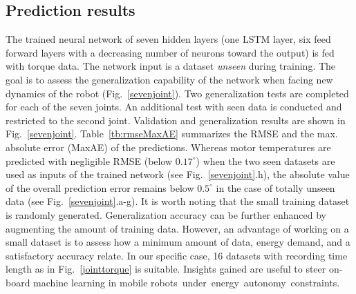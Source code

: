 \documentclass{ifacconf}
\begin{document}
\subsection{Prediction results}
The trained neural network of seven hidden layers (one LSTM layer, six feed forward  layers with a decreasing number of neurons toward the output) is fed with torque data. The network input is a  dataset \textit{unseen} during training.  The goal is to  assess the generalization capability of the network when facing new dynamics of the robot (Fig.~\ref{sevenjoint}). Two generalization tests are completed for each of the seven joints.  An additional test with seen data is conducted and restricted to the second joint. Validation and generalization results are shown in Fig.~\ref{sevenjoint}. Table~\ref{tb:rmseMaxAE} summarizes the RMSE and the max. absolute error (MaxAE) of the predictions. 
Whereas motor temperatures are predicted with negligible RMSE (below $0.17^\circ$) 
when the two seen  datasets are used as inputs of the trained network (see Fig.~\ref{sevenjoint}.h), the absolute value of the overall prediction error remains below $0.5^\circ$ in the case of totally unseen data (see  Fig.~\ref{sevenjoint}.a-g). 
It is worth noting that the small training dataset is randomly generated. Generalization accuracy can be further enhanced by augmenting the amount of training data. However, an advantage of working on a small dataset is to assess how a minimum amount of data, energy demand, and a satisfactory accuracy relate. In our specific case, 16 datasets with recording time length as in Fig.~\ref{jointtorque} is suitable. Insights gained are useful to steer on-board machine learning in  mobile \mbox{robots under energy autonomy constraints.}
\begin{table}[t!]
  \begin{center}
  \caption{RMSE and MaxAE of Fig.~\ref{sevenjoint} a-h.The first RMSE and MaxAE values refer to the upper, the second values refer to the lower plots of the respective motor temperatures.}\label{tb:rmseMaxAE}
  \end{center}
\end{table}
\end{document}
